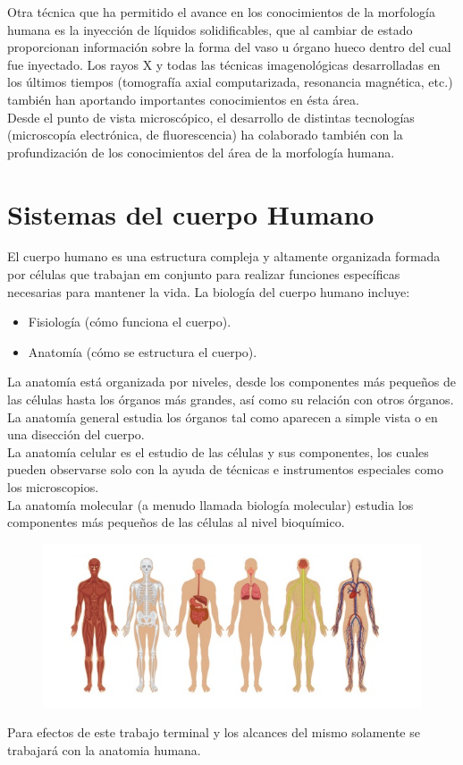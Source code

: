 Otra técnica que ha permitido el avance en los conocimientos de la morfología humana es la inyección de líquidos solidificables, que al cambiar de estado proporcionan información 
sobre la forma del vaso u órgano hueco dentro del cual fue inyectado. Los rayos X y todas las técnicas imagenológicas desarrolladas en los últimos tiempos 
(tomografía axial computarizada, resonancia magnética, etc.) también han aportando importantes conocimientos en ésta área.\\
Desde el punto de vista microscópico, el desarrollo de distintas tecnologías (microscopía electrónica, de fluorescencia) ha colaborado también con la profundización de los 
conocimientos del área de la morfología humana.\\

\section{Sistemas del cuerpo Humano}
El cuerpo humano es una estructura compleja y altamente organizada formada por células que trabajan em conjunto para realizar funciones específicas necesarias 
para mantener la vida.\cite{web17} La biología del cuerpo humano incluye:
\begin{itemize}
	\item Fisiología (cómo funciona el cuerpo).
	\item Anatomía (cómo se estructura el cuerpo).	
\end{itemize}
La anatomía está organizada por niveles, desde los componentes más pequeños de las células hasta los órganos más grandes, así como su relación con otros órganos.\\
La anatomía general estudia los órganos tal como aparecen a simple vista o en una disección del cuerpo.\\
La anatomía celular es el estudio de las células y sus componentes, los cuales pueden observarse solo con la ayuda de técnicas e instrumentos especiales como los microscopios.\\
La anatomía molecular (a menudo llamada biología molecular) estudia los componentes más pequeños de las células al nivel bioquímico.\\
\begin{figure}[H]
\begin{center}
	\includegraphics[width = .7\textwidth]{source/images/image22.png}
	\end{center} 
\end{figure}
Para efectos de este trabajo terminal y los alcances del mismo solamente se trabajará con la anatomia humana.
